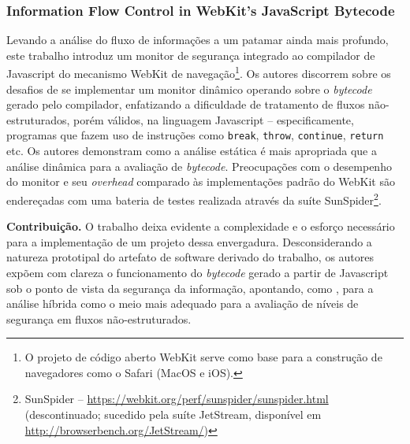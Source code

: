 \subsubsection{Information Flow Control in WebKit's JavaScript Bytecode \cite{Bichhawat2014}}
Levando a análise do fluxo de informações a um patamar ainda mais profundo, este trabalho introduz um monitor de segurança integrado ao compilador de Javascript do mecanismo WebKit de navegação\footnote{O projeto de código aberto WebKit serve como base para a construção de navegadores como o Safari (MacOS e iOS).}. Os autores discorrem sobre os desafios de se implementar um monitor dinâmico operando sobre o \textit{bytecode} gerado pelo compilador, enfatizando a dificuldade de tratamento de fluxos não-estruturados, porém válidos, na linguagem Javascript -- especificamente, programas que fazem uso de instruções como \texttt{break}, \texttt{throw}, \texttt{continue}, \texttt{return} etc. Os autores demonstram como a análise estática é mais apropriada que a análise dinâmica para a avaliação de \textit{bytecode}. Preocupações com o desempenho do monitor e seu \textit{overhead} comparado às implementações padrão do WebKit são endereçadas com uma bateria de testes realizada através da suíte SunSpider\footnote{SunSpider -- \url{https://webkit.org/perf/sunspider/sunspider.html} (descontinuado; sucedido pela suíte JetStream, disponível em \url{http://browserbench.org/JetStream/})}.

\textbf{Contribuição.} O trabalho deixa evidente a complexidade e o esforço necessário para a implementação de um projeto dessa envergadura. Desconsiderando a natureza prototipal do artefato de software derivado do trabalho, os autores expõem com clareza o funcionamento do \textit{bytecode} gerado a partir de Javascript sob o ponto de vista da segurança da informação, apontando, como \cite{Hedin2014}, para a análise híbrida como o meio mais adequado para a avaliação de níveis de segurança em fluxos não-estruturados.


